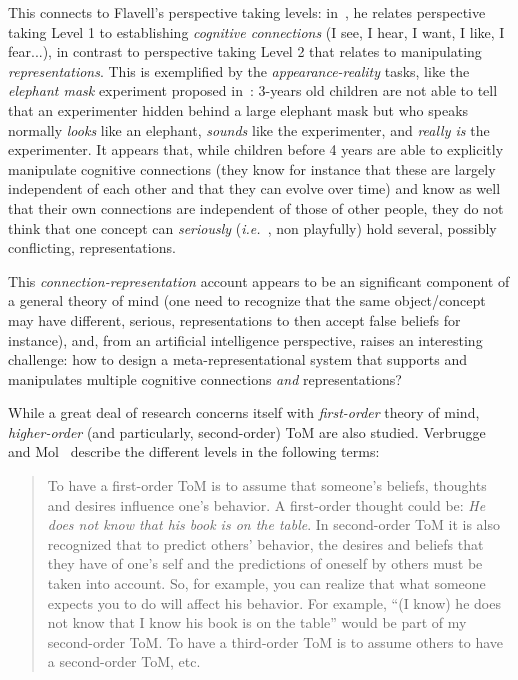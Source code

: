 \documentclass{sig-alternate}
\newcommand{\ie}{{\textit{i.e.~}}}
\begin{document}
This connects to Flavell's perspective taking levels:
in~\cite{flavell1990developmental}, he relates perspective taking Level 1 to
establishing \emph{cognitive connections} (I see, I hear, I want, I like, I
fear...), in contrast to perspective taking Level 2 that relates to manipulating
\emph{representations}.  This is exemplified by the \emph{appearance-reality}
tasks, like the \emph{elephant mask} experiment proposed
in~\cite{flavell1990developmental}: 3-years old children are not able to tell
that an experimenter hidden behind a large elephant mask but who speaks normally
\emph{looks} like an elephant, \emph{sounds} like the experimenter, and
\emph{really is} the experimenter.  It appears that, while children before 4
years are able to explicitly manipulate cognitive connections (they know for
instance that these are largely independent of each other and that they can
evolve over time) and know as well that their own connections are independent of
those of other people, they do not think that one concept can \emph{seriously}
(\ie, non playfully) hold several, possibly conflicting, representations.

This \emph{connection-representation} account appears to be an significant
component of a general theory of mind (one need to recognize that the same
object/concept may have different, serious, representations to then accept false
beliefs for instance), and, from an artificial intelligence perspective, raises
an interesting challenge: how to design a meta-representational system
that supports and manipulates multiple cognitive connections \emph{and}
representations?

While a great deal of research concerns itself with \emph{first-order} theory of
mind, \emph{higher-order} (and particularly, second-order) ToM are also studied.
Verbrugge and Mol~\cite{verbrugge2008learning} describe the different levels in
the following terms:
\begin{quote}
To have a first-order ToM is to assume that someone's beliefs, thoughts and
desires influence one's behavior. A first-order thought could be: \emph{He does not
know that his book is on the table}. In second-order ToM it is also recognized
that to predict others' behavior, the desires and beliefs that they have of
one's self and the predictions of oneself by others must be taken into account.
So, for example, you can realize that what someone expects you to do will affect
his behavior. For example, ``(I know) he does not know that I know his book is on
the table'' would be part of my second-order ToM. To have a third-order ToM is to
assume others to have a second-order ToM, etc.
\end{quote}
\end{document}

